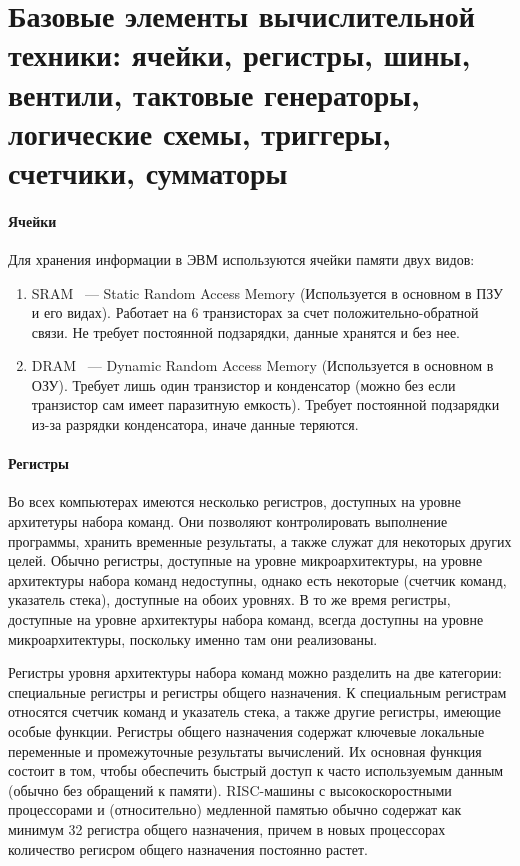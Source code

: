 \documentclass[10pt]{article}
\begin{document}
	\section{Базовые элементы вычислительной техники: ячейки, регистры, шины, вентили, тактовые генераторы, логические схемы, триггеры, счетчики, сумматоры}
	\paragraph{Ячейки}
	Для хранения информации в ЭВМ используются ячейки памяти двух видов:
	\begin{enumerate}
		\item SRAM ~--- Static Random Access Memory (Используется в основном в ПЗУ и его видах). Работает на 6 транзисторах за счет положительно-обратной связи. Не требует постоянной подзарядки, данные хранятся и без нее.
		\item DRAM ~--- Dynamic Random Access Memory (Используется в основном в ОЗУ). Требует лишь один транзистор и конденсатор (можно без если транзистор сам имеет паразитную емкость). Требует постоянной подзарядки из-за разрядки конденсатора, иначе данные теряются.
	\end{enumerate}
	\paragraph{Регистры}
	Во всех компьютерах имеются несколько регистров, доступных на уровне архитетуры набора команд. Они позволяют контролировать выполнение программы, хранить временные результаты, а также служат для некоторых других целей. Обычно регистры, доступные на уровне микроархитектуры, на уровне архитектуры набора команд недоступны, однако есть некоторые (счетчик команд, указатель стека), доступные на обоих уровнях. В то же время регистры, доступные на уровне архитектуры набора команд, всегда доступны на уровне микроархитектуры, поскольку именно там они реализованы.

	Регистры уровня архитектуры набора команд можно разделить на две категории: специальные регистры и регистры общего назначения. К специальным регистрам относятся счетчик команд и указатель стека, а также другие регистры, имеющие особые функции. Регистры общего назначения содержат ключевые локальные переменные и промежуточные результаты вычислений. Их основная функция состоит в том, чтобы обеспечить быстрый доступ к часто используемым данным (обычно без обращений к памяти). RISC-машины с высокоскоростными процессорами и (относительно) медленной памятью обычно содержат как минимум 32 регистра общего назначения, причем в новых процессорах количество регисром общего назначения постоянно растет.
\end{document}
